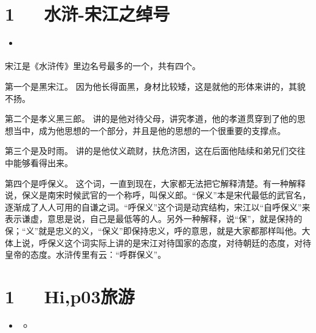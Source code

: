 \documentclass[letterpaper,10pt,english]{sphinxmanual}
\begin{document}
\chapter{1   水浒-宋江之绰号}
\label{\detokenize{p02_u8bfb_u4e66/_u6c34_u6d52-_u5b8b_u6c5f_u4e4b_u7ef0_u53f7:id1}}\label{\detokenize{p02_u8bfb_u4e66/_u6c34_u6d52-_u5b8b_u6c5f_u4e4b_u7ef0_u53f7::doc}}
\begin{sphinxShadowBox}
\begin{itemize}
\item {} 
\label{\detokenize{p02_u8bfb_u4e66/_u6c34_u6d52-_u5b8b_u6c5f_u4e4b_u7ef0_u53f7:id3}}{\hyperref[\detokenize{p02_u8bfb_u4e66/_u6c34_u6d52-_u5b8b_u6c5f_u4e4b_u7ef0_u53f7:id1}]{}}

\end{itemize}
\end{sphinxShadowBox}

宋江是《水浒传》里边名号最多的一个，共有四个。

第一个是黑宋江。
因为他长得面黑，身材比较矮，这是就他的形体来讲的，其貌不扬。

第二个是孝义黑三郎。
讲的是他对待父母，讲究孝道，他的孝道贯穿到了他的思想当中，成为他思想的一个部分，并且是他的思想的一个很重要的支撑点。

第三个是及时雨。
讲的是他仗义疏财，扶危济困，这在后面他陆续和弟兄们交往中能够看得出来。

第四个是呼保义。
这个词，一直到现在，大家都无法把它解释清楚。有一种解释说，保义是南宋时候武官的一个称呼，叫保义郎。“保义”本是宋代最低的武官名，逐渐成了人人可用的自谦之词。“呼保义”这个词是动宾结构，宋江以“自呼保义”来表示谦虚，意思是说，自己是最低等的人。另外一种解释，说“保”，就是保持的保；“义”就是忠义的义，“保义”即保持忠义，呼的意思，就是大家都那样叫他。大体上说，呼保义这个词实际上讲的是宋江对待国家的态度，对待朝廷的态度，对待皇帝的态度。水浒传里有云：“呼群保义”。


\chapter{1   Hi,p03旅游}
\label{\detokenize{p03_u65c5_u6e38/Hello_uff0cp03_u65c5_u6e38:hi-p03}}\label{\detokenize{p03_u65c5_u6e38/Hello_uff0cp03_u65c5_u6e38::doc}}
\begin{sphinxShadowBox}
\begin{itemize}
\item {} 
\label{\detokenize{p03_u65c5_u6e38/Hello_uff0cp03_u65c5_u6e38:id2}}{\hyperref[\detokenize{p03_u65c5_u6e38/Hello_uff0cp03_u65c5_u6e38:hi-p03}]{}}
\begin{itemize}
\item {} 
\label{\detokenize{p03_u65c5_u6e38/Hello_uff0cp03_u65c5_u6e38:id3}}{\hyperref[\detokenize{p03_u65c5_u6e38/Hello_uff0cp03_u65c5_u6e38:post}]{}}

\end{itemize}

\end{itemize}
\end{sphinxShadowBox}
\end{document}
